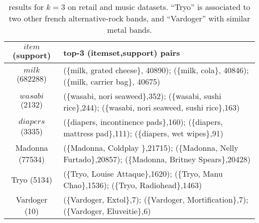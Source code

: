 \begin{table}
		\centering
		\begin{tabular}{|c|l|}
			\hline
			$item$ (support)   & top-3 (itemset,support) pairs\\
			\hline
			$milk$ (\num{682288})  & (\{milk, grated cheese\}, \num{40890}); (\{milk, cola\}, \num{40846}); (\{milk, carrier bag\}, \num{40675}) \\
			$wasabi$ (\num{2132})  & (\{wasabi, nori seaweed\},352);  (\{wasabi, sushi rice\},244);  (\{wasabi, nori seaweed, sushi rice\},163) \\
			$diapers$ (\num{3335}) & (\{diapers, incontinence pads\},160); (\{diapers, mattress pad\},111); (\{diapers, wet wipes\},91) \\ \hline \hline

			Madonna (\num{77534}) & (\{Madonna, Coldplay \},21715); (\{Madonna, Nelly Furtado\},20857); (\{Madonna, Britney Spears\},20428) \\
			Tryo (\num{5134}) & (\{Tryo, Louise Attaque\},1620); (\{Tryo, Manu Chao\},1536); (\{Tryo, Radiohead\},1463) \\
			Vardoger (\num{10}) & (\{Vardoger, Extol\},7); (\{Vardoger, Mortification\},7); (\{Vardoger, Eluveitie\},6) \\ \hline
		\end{tabular}
		\caption{
			\label{tab:toppi:examples}
			\project results for $k=3$ on retail and music datasets.
			``Tryo'' is associated to two other french alternative-rock bands,
			and ``Vardoger'' with similar metal bands.
			}
\end{table}

